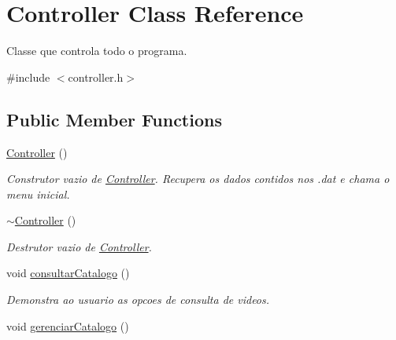 \hypertarget{classController}{}\section{Controller Class Reference}
\label{classController}


Classe que controla todo o programa.  




{\ttfamily \#include $<$controller.\+h$>$}

\subsection*{Public Member Functions}
\begin{DoxyCompactItemize}
\item 
\hyperlink{classController_a95c56822d667e94b031451729ce069a9}{Controller} ()\hypertarget{classController_a95c56822d667e94b031451729ce069a9}{}\label{classController_a95c56822d667e94b031451729ce069a9}

\begin{DoxyCompactList}\small\item\em Construtor vazio de \hyperlink{classController}{Controller}. Recupera os dados contidos nos .dat e chama o menu inicial. \end{DoxyCompactList}\item 
\hyperlink{classController_a0ab87934c4f7a266cfdb86e0f36bc1b5}{$\sim$\+Controller} ()\hypertarget{classController_a0ab87934c4f7a266cfdb86e0f36bc1b5}{}\label{classController_a0ab87934c4f7a266cfdb86e0f36bc1b5}

\begin{DoxyCompactList}\small\item\em Destrutor vazio de \hyperlink{classController}{Controller}. \end{DoxyCompactList}\item 
void \hyperlink{classController_a6d5012c343039e6b297ebfc322be7faf}{consultar\+Catalogo} ()\hypertarget{classController_a6d5012c343039e6b297ebfc322be7faf}{}\label{classController_a6d5012c343039e6b297ebfc322be7faf}

\begin{DoxyCompactList}\small\item\em Demonstra ao usuario as opcoes de consulta de videos. \end{DoxyCompactList}\item 
void \hyperlink{classController_ad86e8f30d10f48506de9129579c202e7}{gerenciar\+Catalogo} ()\hypertarget{classController_ad86e8f30d10f48506de9129579c202e7}{}\label{classController_ad86e8f30d10f48506de9129579c202e7}


\end{DoxyCompactItemize}
